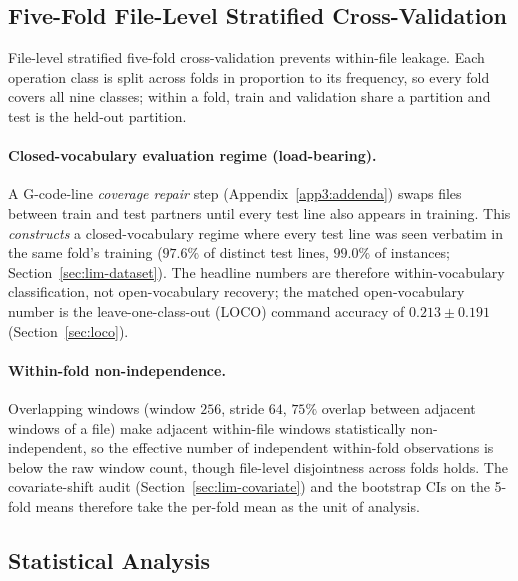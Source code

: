 \documentclass[sensors,article,submit,moreauthors,pdftex]{Definitions/mdpi}
\begin{document}
\subsection{Five-Fold File-Level Stratified Cross-Validation}
\label{sec:cv}

File-level stratified five-fold cross-validation prevents within-file leakage. Each operation class is split across folds in proportion to its frequency, so every fold covers all nine classes; within a fold, train and validation share a partition and test is the held-out partition.

\paragraph{Closed-vocabulary evaluation regime (load-bearing).} A G-code-line \emph{coverage repair} step (Appendix~\ref{app3:addenda}) swaps files between train and test partners until every test line also appears in training. This \emph{constructs} a closed-vocabulary regime where every test line was seen verbatim in the same fold's training ($97.6\%$ of distinct test lines, $99.0\%$ of instances; Section~\ref{sec:lim-dataset}). The headline numbers are therefore within-vocabulary classification, not open-vocabulary recovery; the matched open-vocabulary number is the leave-one-class-out (LOCO) command accuracy of $0.213 \pm 0.191$ (Section~\ref{sec:loco}).

\paragraph{Within-fold non-independence.} Overlapping windows (window $256$, stride $64$, $75\%$ overlap between adjacent windows of a file) make adjacent within-file windows statistically non-independent, so the effective number of independent within-fold observations is below the raw window count, though file-level disjointness across folds holds. The covariate-shift audit (Section~\ref{sec:lim-covariate}) and the bootstrap CIs on the 5-fold means therefore take the per-fold mean as the unit of analysis.


\subsection{Statistical Analysis}
\label{sec:stats}
\end{document}
